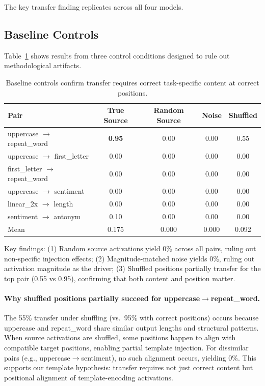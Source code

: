 \documentclass{article}
\begin{document}
The key transfer finding replicates across all four models.

\subsection{Baseline Controls}

Table~\ref{tab:baseline_controls} shows results from three control conditions designed to rule out methodological artifacts.

\begin{table}[h]
\centering
\small
\caption{Baseline controls confirm transfer requires correct task-specific content at correct positions.}
\label{tab:baseline_controls}
\begin{tabular}{@{}lcccc@{}}
\toprule
Pair & True Source & Random Source & Noise & Shuffled \\
\midrule
uppercase $\to$ repeat\_word & \textbf{0.95} & 0.00 & 0.00 & 0.55 \\
uppercase $\to$ first\_letter & 0.00 & 0.00 & 0.00 & 0.00 \\
first\_letter $\to$ repeat\_word & 0.00 & 0.00 & 0.00 & 0.00 \\
uppercase $\to$ sentiment & 0.00 & 0.00 & 0.00 & 0.00 \\
linear\_2x $\to$ length & 0.00 & 0.00 & 0.00 & 0.00 \\
sentiment $\to$ antonym & 0.10 & 0.00 & 0.00 & 0.00 \\
\midrule
Mean & 0.175 & 0.000 & 0.000 & 0.092 \\
\bottomrule
\end{tabular}
\end{table}

Key findings: (1) Random source activations yield 0\% across all pairs, ruling out non-specific injection effects; (2) Magnitude-matched noise yields 0\%, ruling out activation magnitude as the driver; (3) Shuffled positions partially transfer for the top pair (0.55 vs 0.95), confirming that both content and position matter.

\paragraph{Why shuffled positions partially succeed for uppercase$\to$repeat\_word.} The 55\% transfer under shuffling (vs.\ 95\% with correct positions) occurs because uppercase and repeat\_word share similar output lengths and structural patterns. When source activations are shuffled, some positions happen to align with compatible target positions, enabling partial template injection. For dissimilar pairs (e.g., uppercase$\to$sentiment), no such alignment occurs, yielding 0\%. This supports our template hypothesis: transfer requires not just correct content but positional alignment of template-encoding activations.
\end{document}

